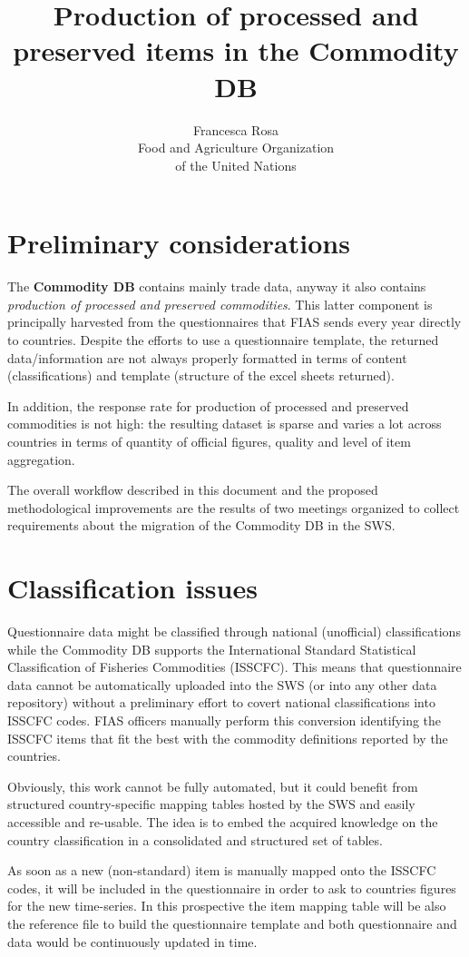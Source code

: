 \documentclass[nojss]{jss}
\title{\bf Production of processed and preserved items in the Commodity DB}
\author{Francesca Rosa\\ Food and Agriculture
    Organization \\ of the United Nations\\}
\begin{document}

\SwaveParseOpstions


\section {Preliminary considerations}
The \textbf{Commodity DB} contains mainly trade data, anyway it also contains \textit{production of processed and preserved commodities}. This latter component is principally harvested from the questionnaires that FIAS sends every year directly to countries. Despite the efforts to use a questionnaire template, the returned data/information are not always properly formatted in terms of content (classifications) and template (structure of the excel sheets returned).

In addition, the  response rate for production of processed and preserved commodities is not high: the resulting dataset is sparse and varies a lot across countries in terms of quantity of official figures, quality and level of item aggregation. 


The overall workflow described in this document and the proposed methodological improvements are the results of two meetings organized to collect requirements about the migration of the Commodity DB in the SWS.

\section{Classification issues}
Questionnaire data might be classified through national (unofficial) classifications while the Commodity DB supports the International Standard Statistical Classification of Fisheries Commodities (ISSCFC). This means that questionnaire data cannot be automatically uploaded into the SWS (or into any other data repository) without a preliminary effort to covert national classifications into ISSCFC codes. FIAS officers manually perform this conversion identifying the ISSCFC items that fit the best with the commodity definitions reported by the countries.

Obviously, this work cannot be fully automated, but it could benefit from structured country-specific mapping tables hosted by the SWS and easily accessible and re-usable. The idea is to embed the acquired knowledge on the country classification in a consolidated and structured set of tables.


As soon as a new (non-standard) item is manually mapped onto the ISSCFC codes, it will be included in the questionnaire in order to ask to countries figures for the new time-series. In this prospective the item mapping table will be also the reference file to build the questionnaire template and both questionnaire and data would be continuously updated in time.
\end{document}
